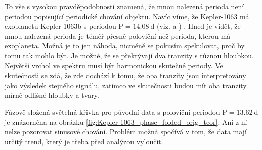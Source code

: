 \documentclass[a4paper,11pt,twocolumn]{article}
\begin{document}
            To vše s vysokou pravděpodobností znamená, že mnou nalezená perioda není periodou popisující periodické chování objektu. Navíc víme, že Kepler-1063 má exoplanetu Kepler-1063b s periodou $\text{P} = 14.08 ~\text{d}$ (viz. \citet{holczer2016} a \citet{morton2016}) . Hned je vidět, že mnou nalezená perioda je téměř přesně poloviční než perioda, kterou má exoplaneta. Možná je to jen náhoda, nicméně se pokusím spekulovat, proč by tomu tak mohlo být. Je možné, že se překrývají dva tranzity s různou hloubkou. Největší vrchol ve spektru musí být harmonickou skutečné periody. Ve skutečnosti se zdá, že zde dochází k tomu, že oba tranzity jsou interpretovány jako výsledek stejného signálu, zatímco ve skutečnosti budou mít oba tranzity mírně odlišné hloubky a tvary.

            Fázově složená světelná křivka pro původní data s poloviční periodou $\text{P} = 13.62 ~\text{d}$ je znázorněna na obrázku \ref{fig:Kepler-1063_phase_folded_orig_teor}. Ani z ní nelze pozorovat sinusové chování. Problém možná spočívá v tom, že data mají určitý trend, který je třeba před analýzou vyloučit.

    
    
        
\end{document}
